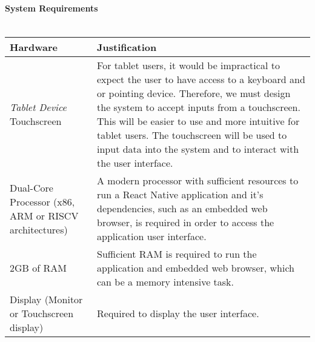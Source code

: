 \documentclass[../../../main.tex]{subfiles}
\begin{document}
\paragraph{System Requirements\\\\}

\begin{tabular}{ |p{}|p{}| }
    \hline
    \textbf{Hardware}                                    & \textbf{Justification}                                                                                                                                                                                                                                   \\
    \hline
    \textit{Tablet Device}\newline
    Touchscreen                                          & For tablet users, it would be impractical to expect the user to have access to a keyboard and or pointing device. Therefore, we must design the system to accept inputs from a touchscreen.
    This will be easier to use and more intuitive for tablet users.
    The touchscreen will be used to input data into the system and to interact with the user interface.                                                                                                                                                                                                             \\
    \hline
    Dual-Core Processor
    \newline(x86, ARM or RISCV architectures)            &
    A modern processor with sufficient resources to run a React Native application and it's dependencies, such as an embedded web browser, is required in order to access the application user interface.                                                                                                           \\
    \hline
    2GB of RAM                                           & Sufficient RAM is required to run the application and embedded web browser, which can be a memory intensive task.                                                                                                                                        \\
    \hline
    Display (Monitor or Touchscreen display)             & Required to display the user interface.                                                                                                                                                                                                                  \\

\end{tabular}
\end{document}
